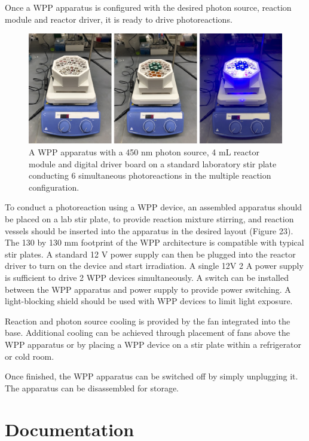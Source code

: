 \documentclass[11pt]{article}
\let\stdsection\section
\renewcommand\section{\clearpage\stdsection}
\begin{document}
Once a WPP apparatus is configured with the desired photon source, reaction module and reactor driver, it is ready to drive photoreactions.

\begin{figure}[H]
  \centering
  \includegraphics[width=\textwidth]{"./fign8.png"}
  \caption{A WPP apparatus with a 450 nm photon source, 4 mL reactor module and digital driver board on a standard laboratory stir plate conducting 6 simultaneous photoreactions in the multiple reaction configuration.}
\end{figure}

To conduct a photoreaction using a WPP device, an assembled apparatus should be placed on a lab stir plate, to provide reaction mixture stirring, and reaction vessels should be inserted into the apparatus in the desired layout (Figure 23).
The 130 by 130 mm footprint of the WPP architecture is compatible with typical stir plates.
A standard 12 V power supply can then be plugged into the reactor driver to turn on the device and start irradiation.
A single 12V 2 A power supply is sufficient to drive 2 WPP devices simultaneously.
A switch can be installed between the WPP apparatus and power supply to provide power switching.
A light-blocking shield should be used with WPP devices to limit light exposure.

Reaction and photon source cooling is provided by the fan integrated into the base.
Additional cooling can be achieved through placement of fans above the WPP apparatus or by placing a WPP device on a stir plate within a refrigerator or cold room.

Once finished, the WPP apparatus can be switched off by simply unplugging it. The apparatus can be disassembled for storage.

\section{Documentation}
\end{document}
